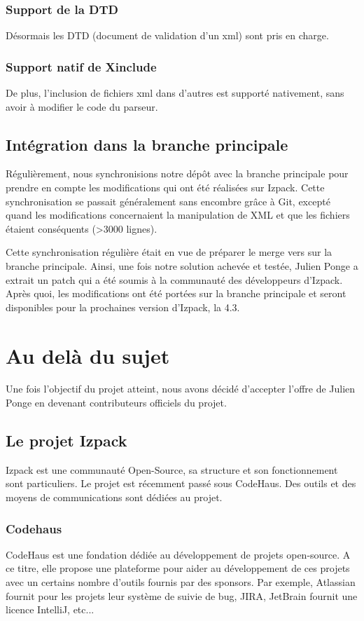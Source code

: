 \subsubsection{Support de la DTD}
Désormais les DTD (document de validation d'un xml) sont pris en charge.
\subsubsection{Support natif de Xinclude}
De plus, l'inclusion de fichiers xml dans d'autres est supporté nativement, sans avoir à modifier le code du parseur.
\subsection{Intégration dans la branche principale}
Régulièrement, nous synchronisions notre dépôt avec la branche principale pour prendre en compte les modifications qui ont été réalisées sur Izpack.
Cette synchronisation se passait généralement sans encombre grâce à Git, excepté quand les modifications concernaient la manipulation de XML et que les fichiers étaient conséquents (>3000 lignes).

Cette synchronisation régulière était en vue de préparer le merge vers sur la branche principale.
Ainsi, une fois notre solution achevée et testée, Julien Ponge a extrait un patch qui a été soumis à la communauté des développeurs d'Izpack.
Après quoi, les modifications ont été portées sur la branche principale et seront disponibles pour la prochaines version d'Izpack, la 4.3.

\section{Au delà du sujet}
Une fois l'objectif du projet atteint, nous avons décidé d'accepter l'offre de Julien Ponge en devenant contributeurs officiels du projet.
\subsection{Le projet Izpack}
Izpack est une communauté Open-Source, sa structure et son fonctionnement sont particuliers. 
Le projet est récemment passé sous CodeHaus. 
Des outils et des moyens de communications sont dédiées au projet.
\subsubsection{Codehaus}
CodeHaus est une fondation dédiée au développement de projets open-source.
A ce titre, elle propose une plateforme pour aider au développement de ces projets avec un certains nombre d'outils fournis par des sponsors.
Par exemple, Atlassian fournit pour les projets leur système de suivie de bug, JIRA, JetBrain fournit une licence IntelliJ, etc...

